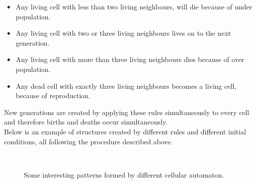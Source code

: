 \documentclass[a4paper,10pt]{article}
\begin{document}
\begin{itemize}
 \item  Any living cell with less than two living neighbours, will die because of under population.
 \item Any living cell with two or three living neighbours lives on to the next generation.
 \item Any living cell with more than three living neighbours dies because of over population.
 \item Any dead cell with exactly three living neighbours becomes a living cell, because of reproduction.
\end{itemize}

New generations are created by applying these rules simultaneously to every cell and therefore births and deaths occur simultaneously. \\

Below is an example of structures created by
different rules and different initial conditions, all following the procedure described above. \\

\begin{figure}[H]
\centering
\mbox{ \quad
{}}
\caption{Some interesting patterns formed by different cellular automaton\cite{conway}.}
\end{figure}
\end{document}

